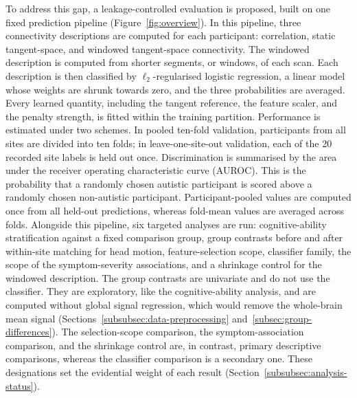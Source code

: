To address this gap, a leakage-controlled evaluation is proposed, built on one fixed
prediction pipeline (Figure~\ref{fig:overview}). In this pipeline, three connectivity
descriptions are computed for each participant: correlation, static tangent-space, and
windowed tangent-space connectivity. The windowed description is computed from shorter
segments, or windows, of each scan. Each description is then classified by
$\ell_2$-regularised logistic regression, a linear model whose weights are shrunk towards
zero, and the three probabilities are averaged. Every learned quantity, including the
tangent reference, the feature scaler, and the penalty strength, is fitted within the
training partition. Performance is estimated under two schemes. In pooled ten-fold
validation, participants from all sites are divided into ten folds; in leave-one-site-out
validation, each of the 20 recorded site labels is held out once. Discrimination is
summarised by the area under the receiver operating characteristic curve (AUROC). This is
the probability that a randomly chosen autistic participant is scored above a randomly
chosen non-autistic participant. Participant-pooled values are computed once from all
held-out predictions, whereas fold-mean values are averaged across folds. Alongside this
pipeline, six targeted analyses are run: cognitive-ability stratification against a
fixed comparison group, group contrasts before and after within-site matching for head
motion, feature-selection scope, classifier family, the scope of the symptom-severity
associations, and a shrinkage control for the windowed description. The group
contrasts are univariate and do not use the classifier. They are exploratory, like the
cognitive-ability analysis, and are computed without global signal regression, which would
remove the whole-brain mean signal (Sections~\ref{subsubsec:data-preprocessing}
and~\ref{subsec:group-differences}). The selection-scope comparison, the symptom-association
comparison, and the shrinkage control are, in contrast, primary descriptive comparisons,
whereas the classifier comparison is a secondary one. These designations set the evidential
weight of each result (Section~\ref{subsubsec:analysis-status}).

